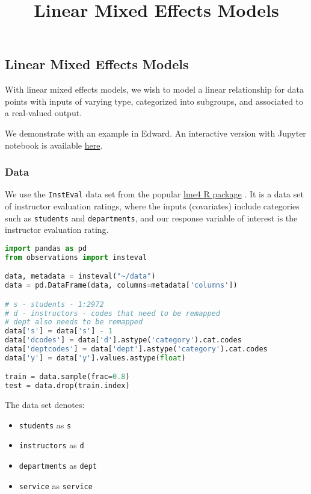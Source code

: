 \title{Linear Mixed Effects Models}

\subsection{Linear Mixed Effects Models}

With linear mixed effects models, we wish to model a linear
relationship for data points with inputs of varying type, categorized
into subgroups, and associated to a real-valued output.

We demonstrate with an example in Edward.
An interactive version with Jupyter notebook is available
\href{http://nbviewer.jupyter.org/github/blei-lab/edward/blob/master/notebooks/linear_mixed_effects_models.ipynb}{here}.

\subsubsection{Data}

We use the \texttt{InstEval} data set from the popular
\href{http://lme4.r-forge.r-project.org}{lme4 R package}
\citep{bates2015fitting}.
It is a data set of instructor evaluation ratings, where the inputs
(covariates) include categories such as \texttt{students} and
\texttt{departments}, and our response variable of interest is the
instructor evaluation rating.

\begin{lstlisting}[language=Python]
import pandas as pd
from observations import insteval

data, metadata = insteval("~/data")
data = pd.DataFrame(data, columns=metadata['columns'])

# s - students - 1:2972
# d - instructors - codes that need to be remapped
# dept also needs to be remapped
data['s'] = data['s'] - 1
data['dcodes'] = data['d'].astype('category').cat.codes
data['deptcodes'] = data['dept'].astype('category').cat.codes
data['y'] = data['y'].values.astype(float)

train = data.sample(frac=0.8)
test = data.drop(train.index)
\end{lstlisting}

The data set denotes:
\begin{itemize}
\item \texttt{students} as \texttt{s}
\item \texttt{instructors} as \texttt{d}
\item \texttt{departments} as \texttt{dept}
\item \texttt{service} as \texttt{service}
\end{itemize}

